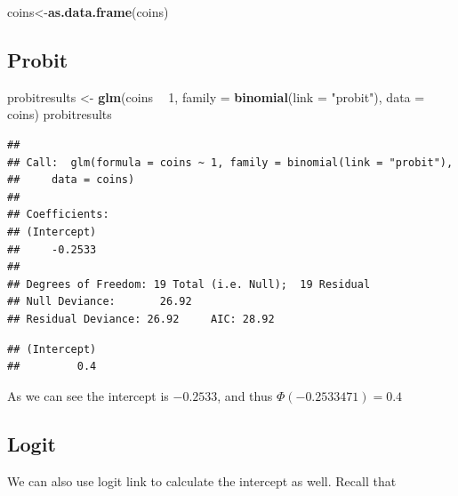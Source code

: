 \documentclass[]{book}
\newenvironment{Shaded}{\begin{snugshade}}{\end{snugshade}}
\newcommand{\DataTypeTok}[1]{\textcolor[rgb]{0.13,0.29,0.53}{#1}}
\newcommand{\DecValTok}[1]{\textcolor[rgb]{0.00,0.00,0.81}{#1}}
\newcommand{\KeywordTok}[1]{\textcolor[rgb]{0.13,0.29,0.53}{\textbf{#1}}}
\newcommand{\NormalTok}[1]{#1}
\newcommand{\OperatorTok}[1]{\textcolor[rgb]{0.81,0.36,0.00}{\textbf{#1}}}
\newcommand{\StringTok}[1]{\textcolor[rgb]{0.31,0.60,0.02}{#1}}
\begin{document}
\begin{Shaded}
\begin{Highlighting}[]
\NormalTok{coins<-}\KeywordTok{as.data.frame}\NormalTok{(coins)}
\end{Highlighting}
\end{Shaded}

\hypertarget{probit-1}{%
\subsection{Probit}\label{probit-1}}

\begin{Shaded}
\begin{Highlighting}[]
\NormalTok{probitresults <-}\StringTok{ }\KeywordTok{glm}\NormalTok{(coins }\OperatorTok{~}\StringTok{ }\DecValTok{1}\NormalTok{, }\DataTypeTok{family =} \KeywordTok{binomial}\NormalTok{(}\DataTypeTok{link =} \StringTok{"probit"}\NormalTok{), }\DataTypeTok{data =}\NormalTok{ coins)}
\NormalTok{probitresults}
\end{Highlighting}
\end{Shaded}

\begin{verbatim}
## 
## Call:  glm(formula = coins ~ 1, family = binomial(link = "probit"), 
##     data = coins)
## 
## Coefficients:
## (Intercept)  
##     -0.2533  
## 
## Degrees of Freedom: 19 Total (i.e. Null);  19 Residual
## Null Deviance:       26.92 
## Residual Deviance: 26.92     AIC: 28.92
\end{verbatim}

\begin{Shaded}
\end{Shaded}

\begin{verbatim}
## (Intercept) 
##         0.4
\end{verbatim}

As we can see the intercept is \(-0.2533\), and thus \(\Phi(-0.2533471)=0.4\)

\hypertarget{logit-1}{%
\subsection{Logit}\label{logit-1}}

We can also use logit link to calculate the intercept as well. Recall that
\end{document}
